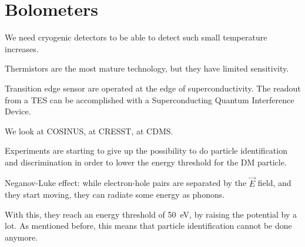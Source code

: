 \documentclass[main.tex]{subfiles}
\begin{document}
\section{Bolometers}


We need cryogenic detectors to be able to detect such small temperature increases. 

Thermistors are the most mature technology, but they have limited sensitivity. 

Transition edge sensor are operated at the edge of superconductivity. 
The readout from a TES can be accomplished with a Superconducting Quantum Interference Device. 

We look at COSINUS, at CRESST, at CDMS. 

Experiments are starting to give up the possibility to do particle identification 
and discrimination in order to lower the energy threshold  for the DM particle. 

Neganov-Luke effect: while electron-hole pairs are separated by the \(\vec{E}\) field, 
and they start moving, they can radiate some energy as phonons. 

With this, they reach an energy threshold of \SI{50}{eV}, by raising the potential
by a lot. As mentioned before, this means that particle identification cannot be done anymore. 
\end{document}
